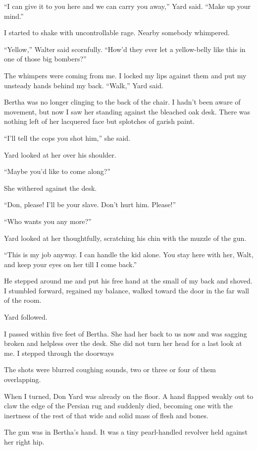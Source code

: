 \documentclass{novel}
\begin{document}
“I can give it to you here and we can carry you away,” Yard said. “Make up your mind.”

I started to shake with uncontrollable rage. Nearby somebody whimpered.

“Yellow,” Walter said scornfully. “How’d they ever let a yellow-belly like this in one of those big bombers?”

The whimpers were coming from me. I locked my lips against them and put my unsteady hands behind my back. “Walk,” Yard said.

Bertha was no longer clinging to the back of the chair. I hadn’t been aware of movement, but now I saw her standing against the bleached oak desk. There was nothing left of her lacquered face but splotches of garish paint.

“I’ll tell the cops you shot him,” she said.

Yard looked at her over his shoulder.

“Maybe you’d like to come along?”

She withered against the desk.

“Don, please! I’ll be your slave. Don’t hurt him. Please!”

“Who wants you any more?”

Yard looked at her thoughtfully, scratching his chin with the muzzle of the gun.

“This is my job anyway. I can handle the kid alone. You stay here with her, Walt, and keep your eyes on her till I come back.”

He stepped around me and put his free hand at the small of my back and shoved. I stumbled forward, regained my balance, walked toward the door in the far wall of the room.

Yard followed.

I passed within five feet of Bertha. She had her back to us now and was sagging broken and helpless over the desk. She did not turn her head for a last look at me. I stepped through the doorways

\scenestars

The shots were blurred coughing sounds, two or three or four of them overlapping.

When I turned, Don Yard was already on the floor. A hand flapped weakly out to claw the edge of the Persian rug and suddenly died, becoming one with the inertness of the rest of that wide and solid mass of flesh and bones.

The gun was in Bertha’s hand. It was a tiny pearl-handled revolver held against her right hip.
\end{document}
